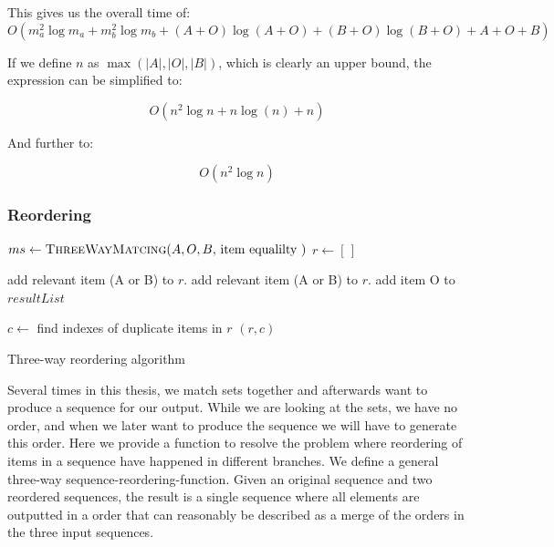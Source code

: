 \documentclass[11pt]{article}
\begin{document}
This gives us the overall time of:
\begin{equation}
O(m_{a}^2 \log m_{a} + m_{b}^2 \log m_{b} + (A+O) \log (A+O) + (B+O) \log (B+O) + A + O + B) \nonumber
\end{equation}

If we define $n$ as $\max(|A|, |O|, |B|)$, which is clearly an upper bound, the expression can be simplified to:

\begin{equation}
O(n^2 \log n + n \log (n) + n) \nonumber
\end{equation}

And further to:

\begin{equation}
O(n^2 \log n) \nonumber
\end{equation}

\subsubsection{Reordering}
\label{ThreeWayReorderingAlgorithmSec}

\begin{algorithm}
\begin{algorithmic}
   \State $ms \gets \Call{ThreeWayMatcing}{A, O, B, $ item equalilty $}$
   \State $r \gets [\,]$
   
         \State add relevant item (A or B) to $r$.
      \EndIf
         \State add relevant item (A or B) to $r$.
      \EndIf
         \State add item O to $resultList$
      \EndIf
      
	\EndFor
	\State $c \gets$ find indexes of duplicate items in $r$
	\State \Return $(r, c)$
\EndFunction
\end{algorithmic}
\caption{Three-way reordering algorithm}
  \label{ThreeWayReorderingAlgorithm}
\end{algorithm}


Several times in this thesis, we match sets together and afterwards want to produce a sequence for our output. While we are looking at the sets, we have no order, and when we later want to produce the sequence we will have to generate this order. Here we provide a function to resolve the problem where reordering of items in a sequence have happened in different branches. We define a general three-way sequence-reordering-function. Given an original sequence and two reordered sequences, the result is a single sequence where all elements are outputted in a order that can reasonably be described as a merge of the orders in the three input sequences.
\end{document}

